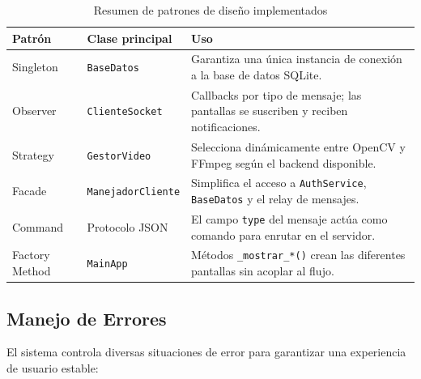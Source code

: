 \documentclass[12pt,a4paper]{article}
\begin{document}
\begin{table}[H]
\centering
\small
\begin{tabular}{p{3cm}p{3.5cm}p{8cm}}
\toprule
\textbf{Patr\'on} & \textbf{Clase principal} & \textbf{Uso} \\
\midrule
Singleton & \texttt{BaseDatos} & Garantiza una \'unica instancia de conexi\'on a la base de datos SQLite. \\
Observer & \texttt{ClienteSocket} & Callbacks por tipo de mensaje; las pantallas se suscriben y reciben notificaciones. \\
Strategy & \texttt{GestorVideo} & Selecciona din\'amicamente entre OpenCV y FFmpeg seg\'un el backend disponible. \\
Facade & \texttt{ManejadorCliente} & Simplifica el acceso a \texttt{AuthService}, \texttt{BaseDatos} y el relay de mensajes. \\
Command & Protocolo JSON & El campo \texttt{type} del mensaje act\'ua como comando para enrutar en el servidor. \\
Factory Method & \texttt{MainApp} & M\'etodos \texttt{\_mostrar\_*()} crean las diferentes pantallas sin acoplar al flujo. \\
\bottomrule
\end{tabular}
\caption{Resumen de patrones de dise\~no implementados}
\end{table}

\subsection{Manejo de Errores}

El sistema controla diversas situaciones de error para garantizar una experiencia de usuario estable:
\end{document}
